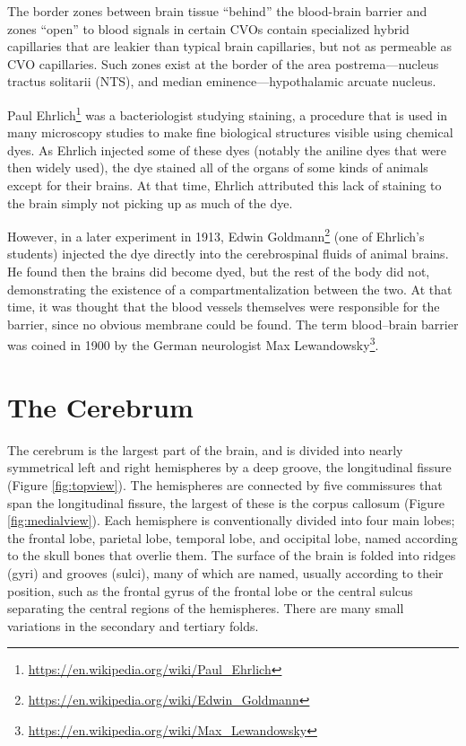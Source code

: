 \documentclass[]{book}
\let\rmarkdownfootnote\footnote%
\def\footnote{\protect\rmarkdownfootnote}
\renewcommand{\href}[2]{#2\footnote{\url{#1}}}
\begin{document}
The border zones between brain tissue ``behind'' the blood-brain barrier and zones ``open'' to blood signals in certain CVOs contain specialized hybrid capillaries that are leakier than typical brain capillaries, but not as permeable as CVO capillaries. Such zones exist at the border of the area postrema---nucleus tractus solitarii (NTS), and median eminence---hypothalamic arcuate nucleus.

\href{https://en.wikipedia.org/wiki/Paul_Ehrlich}{Paul Ehrlich} was a bacteriologist studying staining, a procedure that is used in many microscopy studies to make fine biological structures visible using chemical dyes. As Ehrlich injected some of these dyes (notably the aniline dyes that were then widely used), the dye stained all of the organs of some kinds of animals except for their brains. At that time, Ehrlich attributed this lack of staining to the brain simply not picking up as much of the dye.

However, in a later experiment in 1913, \href{https://en.wikipedia.org/wiki/Edwin_Goldmann}{Edwin Goldmann} (one of Ehrlich's students) injected the dye directly into the cerebrospinal fluids of animal brains. He found then the brains did become dyed, but the rest of the body did not, demonstrating the existence of a compartmentalization between the two. At that time, it was thought that the blood vessels themselves were responsible for the barrier, since no obvious membrane could be found. The term blood--brain barrier was coined in 1900 by the German neurologist \href{https://en.wikipedia.org/wiki/Max_Lewandowsky}{Max Lewandowsky}.

\hypertarget{the-cerebrum}{%
\section{The Cerebrum}\label{the-cerebrum}}

The cerebrum is the largest part of the brain, and is divided into nearly symmetrical left and right hemispheres by a deep groove, the longitudinal fissure (Figure \ref{fig:topview}). The hemispheres are connected by five commissures that span the longitudinal fissure, the largest of these is the corpus callosum (Figure \ref{fig:medialview}). Each hemisphere is conventionally divided into four main lobes; the frontal lobe, parietal lobe, temporal lobe, and occipital lobe, named according to the skull bones that overlie them. The surface of the brain is folded into ridges (gyri) and grooves (sulci), many of which are named, usually according to their position, such as the frontal gyrus of the frontal lobe or the central sulcus separating the central regions of the hemispheres. There are many small variations in the secondary and tertiary folds.
\end{document}
